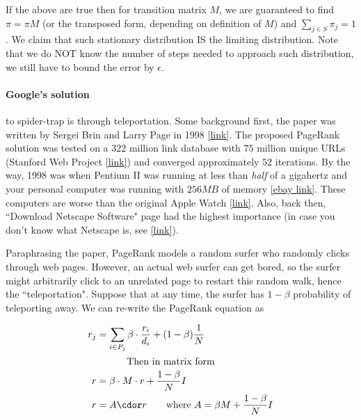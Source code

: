 If the above are true then for transition matrix $M$, we are guaranteed to find $\pi = \pi M$ (or the transposed form, depending on definition of $M$) and $\sum_{j \in S}\pi_j = 1$. We claim that such stationary distribution IS the limiting distribution. Note that we do NOT know the number of steps needed to approach such distribution, we still have to bound the error by $\epsilon$.




\paragraph{Google's solution} to spider-trap is through teleportation. Some background first, the paper was written by Sergei Brin and Larry Page in 1998 \href{http://ilpubs.stanford.edu:8090/422/1/1999-66.pdf}{[link]}. The proposed PageRank solution was tested on a $322$ million link database with $75$ million unique URLs  (Stanford Web Project \href{http://dbpubs.stanford.edu:8091/~testbed/doc2/WebBase/}{[link]}) and converged approximately $52$ iterations. By the way, 1998 was when Pentium II was running at less than \textit{half} of a gigahertz and your personal computer was running with $256MB$ of memory \href{https://www.ebay.com/itm/Vintage-Gateway-GP6-450-Pentium-II-450MHz-256MB-RAM-Desktop-Computer/133274714370?hash=item1f07cac102:g:~XwAAOSwB8Nd-Grg}{[ebay link]}. These computers are worse than the original Apple Watch \href{https://www.gsmarena.com/apple_watch_42mm_(1st_gen)-7696.php}{[link]}. Also, back then, ``Download Netscape Software" page had the highest importance (in case you don't know what Netscape is, see \href{https://en.wikipedia.org/wiki/Netscape_(web_browser)}{[link]}). 

Paraphrasing the paper, PageRank models a random surfer who randomly clicks through web pages. However, an actual web surfer can get bored, so the surfer might arbitrarily click to an unrelated page to restart this random walk, hence the ``teleportation". Suppose that at any time, the surfer has $1 - \beta$ probability of teleporting away. We can re-write the PageRank equation as 

\begin{align}
    r_j &= \sum_{i \in P_j } \beta \cdot \frac{r_i}{d_i} + (1 - \beta) \frac{1}{N} \\
    \intertext{\qquad \qquad Then in matrix form}
    r &= \beta \cdot M \cdot r + \frac{1 - \beta}{N} I \\
    r &= A \cdor r \text{\qquad where $A = \beta M + \frac{1 - \beta}{N} I$}
\end{align}{}

